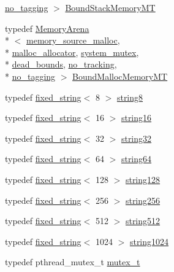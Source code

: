 \begin{DoxyCompactItemize}
\hyperlink{structcrap_1_1no__tagging}{no\+\_\+tagging} $>$ \hyperlink{namespacecrap_a9e4f3d9be875850166fb480763ce7abb}{Bound\+Stack\+Memory\+M\+T}
\item 
typedef \hyperlink{classcrap_1_1_memory_arena}{Memory\+Arena}\\*
$<$ \hyperlink{classcrap_1_1memory__source__malloc}{memory\+\_\+source\+\_\+malloc}, \\*
\hyperlink{classcrap_1_1malloc__allocator}{malloc\+\_\+allocator}, \hyperlink{classcrap_1_1system__mutex}{system\+\_\+mutex}, \\*
\hyperlink{structcrap_1_1dead__bounds}{dead\+\_\+bounds}, \hyperlink{structcrap_1_1no__tracking}{no\+\_\+tracking}, \\*
\hyperlink{structcrap_1_1no__tagging}{no\+\_\+tagging} $>$ \hyperlink{namespacecrap_a0e1ad1a243444e07c558d2553b3949da}{Bound\+Malloc\+Memory\+M\+T}
\item 
typedef \hyperlink{classcrap_1_1fixed__string}{fixed\+\_\+string}$<$ 8 $>$ \hyperlink{namespacecrap_ac2aa8c51f82e95df485b8fff38837fcb}{string8}
\item 
typedef \hyperlink{classcrap_1_1fixed__string}{fixed\+\_\+string}$<$ 16 $>$ \hyperlink{namespacecrap_a6cff91a13d8be23072b3a0754c947caa}{string16}
\item 
typedef \hyperlink{classcrap_1_1fixed__string}{fixed\+\_\+string}$<$ 32 $>$ \hyperlink{namespacecrap_aed2599e591e7287057648c41883194c6}{string32}
\item 
typedef \hyperlink{classcrap_1_1fixed__string}{fixed\+\_\+string}$<$ 64 $>$ \hyperlink{namespacecrap_a2b8a7358804e1a9c3c32f12d8cdcfdf8}{string64}
\item 
typedef \hyperlink{classcrap_1_1fixed__string}{fixed\+\_\+string}$<$ 128 $>$ \hyperlink{namespacecrap_a6d163720fa009acb153550f4486ff6da}{string128}
\item 
typedef \hyperlink{classcrap_1_1fixed__string}{fixed\+\_\+string}$<$ 256 $>$ \hyperlink{namespacecrap_af674ac1cc38a09c563c68dfc3b15e554}{string256}
\item 
typedef \hyperlink{classcrap_1_1fixed__string}{fixed\+\_\+string}$<$ 512 $>$ \hyperlink{namespacecrap_a52392ad28972b8b96725b2f7928d38fa}{string512}
\item 
typedef \hyperlink{classcrap_1_1fixed__string}{fixed\+\_\+string}$<$ 1024 $>$ \hyperlink{namespacecrap_acbceaa050a351b36f8b29129f49621c1}{string1024}
\item 
typedef pthread\+\_\+mutex\+\_\+t \hyperlink{namespacecrap_a8800d1b9942594aef7c29a82865908b5}{mutex\+\_\+t}

\end{DoxyCompactItemize}
